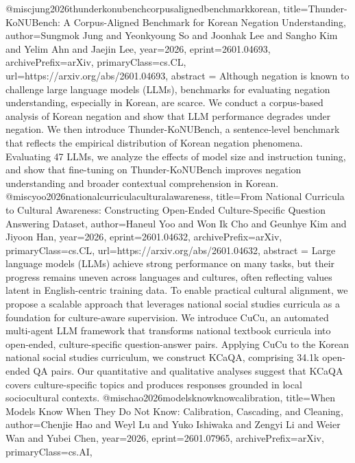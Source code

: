 {}@misc{jung2026thunderkonubenchcorpusalignedbenchmarkkorean,
      title={Thunder-KoNUBench: A Corpus-Aligned Benchmark for Korean Negation Understanding}, 
      author={Sungmok Jung and Yeonkyoung So and Joonhak Lee and Sangho Kim and Yelim Ahn and Jaejin Lee},
      year={2026},
      eprint={2601.04693},
      archivePrefix={arXiv},
      primaryClass={cs.CL},
      url={https://arxiv.org/abs/2601.04693},
      abstract = {Although negation is known to challenge large language models (LLMs), benchmarks for evaluating negation understanding, especially in Korean, are scarce. We conduct a corpus-based analysis of Korean negation and show that LLM performance degrades under negation. We then introduce Thunder-KoNUBench, a sentence-level benchmark that reflects the empirical distribution of Korean negation phenomena. Evaluating 47 LLMs, we analyze the effects of model size and instruction tuning, and show that fine-tuning on Thunder-KoNUBench improves negation understanding and broader contextual comprehension in Korean.}
}@misc{yoo2026nationalcurriculaculturalawareness,
      title={From National Curricula to Cultural Awareness: Constructing Open-Ended Culture-Specific Question Answering Dataset}, 
      author={Haneul Yoo and Won Ik Cho and Geunhye Kim and Jiyoon Han},
      year={2026},
      eprint={2601.04632},
      archivePrefix={arXiv},
      primaryClass={cs.CL},
      url={https://arxiv.org/abs/2601.04632},
      abstract = {Large language models (LLMs) achieve strong performance on many tasks, but their progress remains uneven across languages and cultures, often reflecting values latent in English-centric training data. To enable practical cultural alignment, we propose a scalable approach that leverages national social studies curricula as a foundation for culture-aware supervision. We introduce CuCu, an automated multi-agent LLM framework that transforms national textbook curricula into open-ended, culture-specific question-answer pairs. Applying CuCu to the Korean national social studies curriculum, we construct KCaQA, comprising 34.1k open-ended QA pairs. Our quantitative and qualitative analyses suggest that KCaQA covers culture-specific topics and produces responses grounded in local sociocultural contexts.}
}@misc{hao2026modelsknowknowcalibration,
      title={When Models Know When They Do Not Know: Calibration, Cascading, and Cleaning}, 
      author={Chenjie Hao and Weyl Lu and Yuko Ishiwaka and Zengyi Li and Weier Wan and Yubei Chen},
      year={2026},
      eprint={2601.07965},
      archivePrefix={arXiv},
      primaryClass={cs.AI},
}
